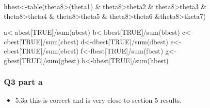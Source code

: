 \documentclass[
]{book}
\newenvironment{Shaded}{\begin{snugshade}}{\end{snugshade}}
\newcommand{\FunctionTok}[1]{\textcolor[rgb]{0.00,0.00,0.00}{#1}}
\newcommand{\NormalTok}[1]{#1}
\newcommand{\OtherTok}[1]{\textcolor[rgb]{0.56,0.35,0.01}{#1}}
\newcommand{\SpecialCharTok}[1]{\textcolor[rgb]{0.00,0.00,0.00}{#1}}
\newcommand{\StringTok}[1]{\textcolor[rgb]{0.31,0.60,0.02}{#1}}
\providecommand{\tightlist}{%
  \setlength{\itemsep}{0pt}\setlength{\parskip}{0pt}}
\theoremstyle{definition}
\theoremstyle{definition}
\theoremstyle{definition}
\theoremstyle{definition}
\theoremstyle{remark}
\begin{document}
\begin{Shaded}
\begin{Highlighting}[]
\NormalTok{  hbest}\OtherTok{\textless{}{-}}\FunctionTok{table}\NormalTok{(theta8}\SpecialCharTok{\textgreater{}}\NormalTok{(theta1) }\SpecialCharTok{\&}\NormalTok{ theta8}\SpecialCharTok{\textgreater{}}\NormalTok{theta2 }\SpecialCharTok{\&}\NormalTok{ theta8}\SpecialCharTok{\textgreater{}}\NormalTok{theta3 }\SpecialCharTok{\&}\NormalTok{ theta8}\SpecialCharTok{\textgreater{}}\NormalTok{theta4 }\SpecialCharTok{\&}\NormalTok{ theta8}\SpecialCharTok{\textgreater{}}\NormalTok{theta5 }\SpecialCharTok{\&}\NormalTok{ theta8}\SpecialCharTok{\textgreater{}}\NormalTok{theta6 }\SpecialCharTok{\&}\NormalTok{theta8}\SpecialCharTok{\textgreater{}}\NormalTok{theta7)}
  
\NormalTok{  a}\OtherTok{\textless{}{-}}\NormalTok{abest[}\StringTok{\textquotesingle{}TRUE\textquotesingle{}}\NormalTok{]}\SpecialCharTok{/}\FunctionTok{sum}\NormalTok{(abest)}
\NormalTok{  b}\OtherTok{\textless{}{-}}\NormalTok{bbest[}\StringTok{\textquotesingle{}TRUE\textquotesingle{}}\NormalTok{]}\SpecialCharTok{/}\FunctionTok{sum}\NormalTok{(bbest)}
\NormalTok{  c}\OtherTok{\textless{}{-}}\NormalTok{cbest[}\StringTok{\textquotesingle{}TRUE\textquotesingle{}}\NormalTok{]}\SpecialCharTok{/}\FunctionTok{sum}\NormalTok{(cbest)}
\NormalTok{  d}\OtherTok{\textless{}{-}}\NormalTok{dbest[}\StringTok{\textquotesingle{}TRUE\textquotesingle{}}\NormalTok{]}\SpecialCharTok{/}\FunctionTok{sum}\NormalTok{(dbest)}
\NormalTok{  e}\OtherTok{\textless{}{-}}\NormalTok{ebest[}\StringTok{\textquotesingle{}TRUE\textquotesingle{}}\NormalTok{]}\SpecialCharTok{/}\FunctionTok{sum}\NormalTok{(ebest)}
\NormalTok{  f}\OtherTok{\textless{}{-}}\NormalTok{fbest[}\StringTok{\textquotesingle{}TRUE\textquotesingle{}}\NormalTok{]}\SpecialCharTok{/}\FunctionTok{sum}\NormalTok{(fbest)}
\NormalTok{  g}\OtherTok{\textless{}{-}}\NormalTok{gbest[}\StringTok{\textquotesingle{}TRUE\textquotesingle{}}\NormalTok{]}\SpecialCharTok{/}\FunctionTok{sum}\NormalTok{(gbest)}
\NormalTok{  h}\OtherTok{\textless{}{-}}\NormalTok{hbest[}\StringTok{\textquotesingle{}TRUE\textquotesingle{}}\NormalTok{]}\SpecialCharTok{/}\FunctionTok{sum}\NormalTok{(hbest)}
\end{Highlighting}
\end{Shaded}

\hypertarget{q3-part-a}{%
\subsubsection{Q3 part a}\label{q3-part-a}}

\begin{itemize}
\tightlist
\item
  5.3a this is correct and is very close to section 5 results.
\end{itemize}
\end{document}
